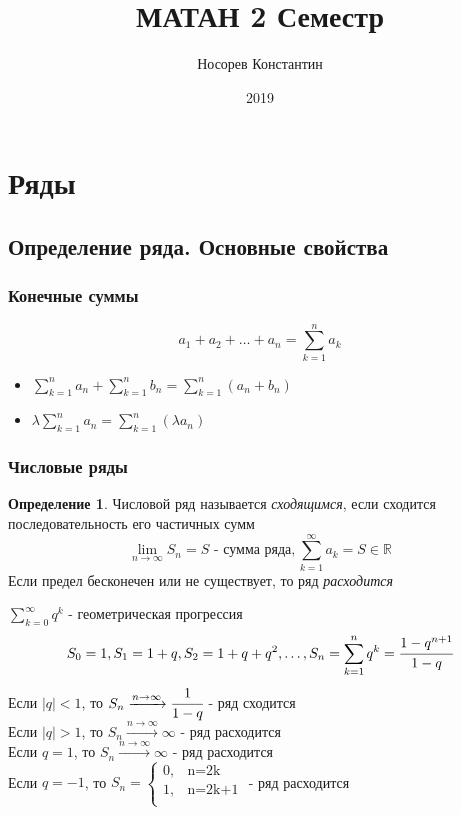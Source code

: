 \documentclass[a4paper]{article}
\title{ МАТАН 2 Семестр}
\author{Носорев Константин}
\date{2019\\}
\theoremstyle{definition}
\newtheorem{definition}{Определение}
\newcommand\abs[1]{%
\mbox{$| #1 |$}}
\numberwithin{theorem}{subsection}
\numberwithin{lemma}{subsection}
\numberwithin{definition}{subsection}
\numberwithin{comment*}{subsection}
\numberwithin{consequence}{subsection}
\numberwithin{property}{subsection}
\begin{document}
\maketitle
\tableofcontents
\section{Ряды}
\subsection{Определение ряда. Основные свойства}
\setcounter{subsubsection}{-1}

\subsubsection{Конечные суммы}
$$a_1+a_2+\dots+a_n = \sum_{k=1}^{n} a_k$$
\begin{itemize}
 \item $\sum_{k=1}^{n}{a_n} + \sum_{k=1}^{n}{b_n} = \sum_{k=1}^{n}{(a_n+b_n)}$
 \item $\lambda \sum_{k=1}^{n}{a_n} = \sum_{k=1}^{n}{(\lambda a_n)}$
\end{itemize}
\subsubsection{Числовые ряды}
\begin{definition}
 Числовой ряд называется \textit{сходящимся}, если сходится последовательность его частичных сумм
 $$\lim_{n\rightarrow \infty}{S_n}=S \text{ - сумма ряда}, \sum_{k=1}^{\infty}{a_k} = S \in \mathbb{R} $$
 Если предел бесконечен или не существует, то ряд \textit{расходится}
\end{definition}
\exmp $\sum_{k=0}^{\infty}{q^k} \text{ - геометрическая прогрессия }$
$$S_0 = 1, S_1 = 1+q, S_2= 1 + q +q^2, \dots , S_n = \sum_{k=1}^{n}{q^k} = \cfrac{1-q^{n+1}}{1-q}$$
Если $\abs{q} < 1$, то $S_n \xrightarrow{n\rightarrow \infty} \cfrac{1}{1-q}$ - ряд сходится\\
Если $\abs{q} > 1$, то $S_n \xrightarrow{n\rightarrow \infty} \infty$ - ряд расходится\\
Если $q = 1$, то $S_n \xrightarrow{n\rightarrow \infty} \infty$ - ряд расходится\\
Если $q = -1$, то $S_n = \begin{cases}
  0, & \text{n=2k}   \\
  1, & \text{n=2k+1} \\
 \end{cases}$ - ряд расходится
\end{document}
